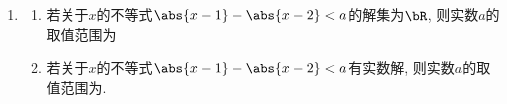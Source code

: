 \begin{enumerate}
\begin{enumerate}
\begin{jieda}
\begin{enumerate}
            首先将问题转化为左侧的最小值大于等于右侧，设函数$f(x) = |x-2a| + |2x-a|$，根据斜底锅函数的图象可知，其最低点必然位于系数绝对值最大的一项取零的位置，即$x = \frac{a}{2}$，最小值为$|\frac{3a}{2}|$，由此不等式可以转化为$|\frac{3a}{2}| \geq a^2$，即$|\frac{3}{2}| \geq |a|$，故$a \in [-\frac{3}{2}, \frac{3}{2}]$
            \item 方法2 \\
            通过设$x = ka(k \in \mathbf{R})$来简化计算。\\
            根据$x = ka(k \in \mathbf{R})$，不等式可以化为$|ka - 2a| + |2ka - a| \geq a^2$，\\
            消去$|a|$，不等式变为$|k - 2| + |2k - 1| \geq |a|$。\\
            通过对$k$进行分类讨论，可以得到$|k - 2| + |2k - 1|$的取值范围为$[\frac{3}{2}, +\infty)$，故$|a| \leq \frac{3}{2}$，即$a \in [-\frac{3}{2}, \frac{3}{2}]$
            \end{enumerate}
            \ps 斜底锅函数$f(x) = |ax+b|+|cx+d|$（$|a| \neq |c|$），若$|a| > |c|$，则取最小值时$x = -\frac{b}{a}$，若$|a| < |c|$，则取最小值时$x = -\frac{d}{c}$
        \end{jieda}
    \item 
    \begin{enumerate}
        \item  若关于$x$的不等式$\abs{x-1}-\abs{x-2}<a$的解集为$\bR$, 则实数$a$的取值范围为
        
        \item 若关于$x$的不等式$\abs{x-1}-\abs{x-2}<a$有实数解, 则实数$a$的取值范围为. 
        

\end{enumerate}
\end{enumerate}
\end{enumerate}
